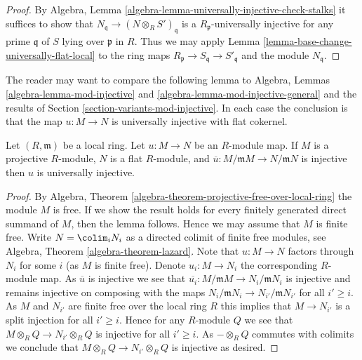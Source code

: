 \begin{proof}
By
Algebra, Lemma \ref{algebra-lemma-universally-injective-check-stalks}
it suffices to show that $N_{\mathfrak q} \to (N \otimes_R S')_{\mathfrak q}$
is a $R_{\mathfrak p}$-universally injective for any prime $\mathfrak q$
of $S$ lying over $\mathfrak p$ in $R$. Thus we may apply
Lemma \ref{lemma-base-change-universally-flat-local}
to the ring maps
$R_{\mathfrak p} \to S_{\mathfrak q} \to S'_{\mathfrak q}$
and the module $N_{\mathfrak q}$.
\end{proof}

\noindent
The reader may want to compare the following lemma to
Algebra, Lemmas \ref{algebra-lemma-mod-injective} and
\ref{algebra-lemma-mod-injective-general} and the results of
Section \ref{section-variants-mod-injective}.
In each case the conclusion is that the map $u : M \to N$ is
universally injective with flat cokernel.

\begin{lemma}
\label{lemma-universally-injective-local}
Let $(R, \mathfrak m)$ be a local ring. Let $u : M \to N$ be an $R$-module map.
If $M$ is a projective $R$-module, $N$ is a flat $R$-module, and
$\overline{u} : M/\mathfrak mM \to N/\mathfrak mN$ is injective
then $u$ is universally injective.
\end{lemma}

\begin{proof}
By
Algebra, Theorem \ref{algebra-theorem-projective-free-over-local-ring}
the module $M$ is free. If we show the result holds for every finitely
generated direct summand of $M$, then the lemma follows. Hence we may
assume that $M$ is finite free. Write $N = \colim_i N_i$ as
a directed colimit of finite free modules, see
Algebra, Theorem \ref{algebra-theorem-lazard}.
Note that $u : M \to N$ factors through $N_i$ for some $i$ (as $M$ is finite
free). Denote $u_i : M \to N_i$ the corresponding $R$-module map.
As $\overline{u}$ is injective we see that
$\overline{u_i} : M/\mathfrak mM \to N_i/\mathfrak mN_i$ is
injective and remains injective on composing with the maps
$N_i/\mathfrak mN_i \to N_{i'}/\mathfrak mN_{i'}$ for all $i' \geq i$.
As $M$ and $N_{i'}$ are finite free over the local ring $R$ this implies
that $M \to N_{i'}$ is a split injection for all $i' \geq i$. Hence
for any $R$-module $Q$ we see that $M \otimes_R Q \to N_{i'} \otimes_R Q$
is injective for all $i' \geq i$. As $- \otimes_R Q$ commutes with
colimits we conclude that $M \otimes_R Q \to N_{i'} \otimes_R Q$
is injective as desired.
\end{proof}

